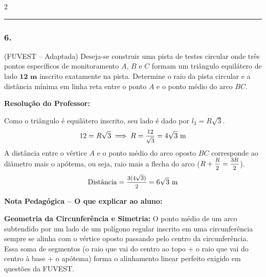 \begin{multicols*}{2}
\par\vspace{\espacoQuestao}

\noindent\textcolor{CorLinha}{\rule{\linewidth}{0.5pt}} 
\par\vspace{\espacoPreQuestao}

\subsubsection*{6.} (FUVEST -- Adaptada) Deseja-se construir uma pista de testes circular onde três pontos específicos de monitoramento $A$, $B$ e $C$ formam um triângulo equilátero de lado $\mathbf{12\text{ m}}$ inscrito exatamente na pista. Determine o raio da pista circular e a distância mínima em linha reta entre o ponto $A$ e o ponto médio do arco $BC$.

\ifgabarito
    \begin{tcolorbox}[colback=CorTitUm!5, colframe=CorTitUm, boxrule=1pt, arc=4pt, left=6pt, right=6pt, top=6pt, bottom=6pt]
    \small\textbf{\textcolor{CorTitUm}{Resolução do Professor:}}\par\vspace{0.1cm}
    \color{CinzaEscuro}
    Como o triângulo é equilátero inscrito, seu lado é dado por $l_3 = R\sqrt{3}$. 
    \[ 12 = R\sqrt{3} \implies R = \mfrac{12}{\sqrt{3}} = 4\sqrt{3} \text{ m} \]
    A distância entre o vértice $A$ e o ponto médio do arco oposto $BC$ corresponde ao diâmetro mais o apótema, ou seja, raio mais a flecha do arco ($R + \mfrac{R}{2} = \mfrac{3R}{2}$).
    \[ \text{Distância} = \mfrac{3(4\sqrt{3})}{2} = 6\sqrt{3} \text{ m} \]
    \end{tcolorbox}
    
    \begin{boxpedagogica}
    \textbf{\textcolor{CorVerdeBorda}{Nota Pedagógica -- O que explicar ao aluno:}}\par\vspace{0.1cm}
    \color{CinzaEscuro}
    \textbf{Geometria da Circunferência e Simetria:} O ponto médio de um arco subtendido por um lado de um polígono regular inscrito em uma circunferência sempre se alinha com o vértice oposto passando pelo centro da circunferência. Essa soma de segmentos (o raio que vai do centro ao topo + o raio que vai do centro à base + o apótema) forma o alinhamento linear perfeito exigido em questões da FUVEST.
    \end{boxpedagogica}
\fi


\end{multicols*}

